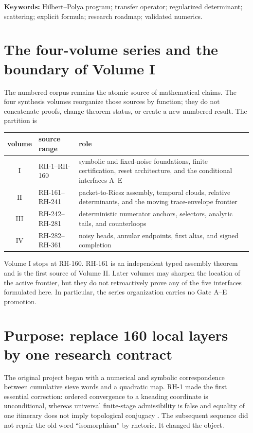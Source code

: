 \documentclass[11pt]{article}
\theoremstyle{definition}
\theoremstyle{remark}
\begin{document}
\noindent\textbf{Keywords:} Hilbert--Polya program; transfer operator;
regularized determinant; scattering; explicit formula; research roadmap;
validated numerics.

\section{The four-volume series and the boundary of Volume I}

The numbered corpus remains the atomic source of mathematical claims.  The
four synthesis volumes reorganize those sources by function; they do not
concatenate proofs, change theorem status, or create a new numbered result.
The partition is
\begin{center}
\begin{tabular}{clp{8.3cm}}
\toprule
volume & source range & role\\
\midrule
I & RH-1--RH-160 & symbolic and fixed-noise foundations, finite certification,
reset architecture, and the conditional interfaces A--E\\
II & RH-161--RH-241 & packet-to-Riesz assembly, temporal clouds, relative
determinants, and the moving trace-envelope frontier\\
III & RH-242--RH-281 & deterministic numerator anchors, selectors, analytic
tails, and counterloops\\
IV & RH-282--RH-361 & noisy heads, annular endpoints, first alias, and signed
completion\\
\bottomrule
\end{tabular}
\end{center}

Volume I stops at RH-160.  RH-161 is an independent typed assembly theorem
and is the first source of Volume II.  Later volumes may sharpen the location
of the active frontier, but they do not retroactively prove any of the five
interfaces formulated here.  In particular, the series organization carries
no Gate A--E promotion.

\section{Purpose: replace 160 local layers by one research contract}

The original project began with a numerical and symbolic correspondence
between cumulative sieve words and a quadratic map.  RH-1 made the first
essential correction: ordered convergence to a kneading coordinate is
unconditional, whereas universal finite-stage admissibility is false and
equality of one itinerary does not imply topological conjugacy
\citep{WangRH1,WangPublished}.  The subsequent sequence did not repair the
old word ``isomorphism'' by rhetoric.  It changed the object.
\end{document}
